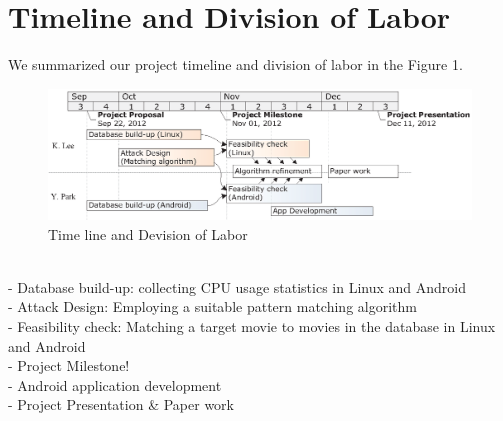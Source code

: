 \section{Timeline and Division of Labor}
\label{sec:timeline}
We summarized our project timeline and division of labor in the Figure 1. \\
\begin{figure}[!ht]
\centering
\includegraphics[scale=1]{Figures/Timeline}
\caption{Time line and Devision of Labor}
\end{figure}\\
- Database build-up: collecting CPU usage statistics in Linux and Android\\
- Attack Design: Employing a suitable pattern matching algorithm\\
- Feasibility check: Matching a target movie to movies in the database in Linux and Android \\
- Project Milestone!\\
- Android application development\\
- Project Presentation \& Paper work
